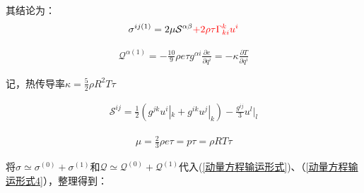 \documentclass[LBMDerivation.tex]{subfiles}
\begin{document}
其结论为：
\begin{equation}
  \begin{gathered}
    \sigma^{ij(1)}= 2 \mu \mathcal{S}^{\alpha\beta}   {\color{red} + 2\rho \tau \Gamma_{ki}^k u^i}
  \end{gathered}
\end{equation}




\begin{equation}
  \begin{gathered}
    \mathcal{Q}^{\alpha (1)}
    = -\frac{10}{9}\rho e \tau g^{\alpha i}\frac{\partial e}{\partial q^i} = -\kappa \frac{\partial T}{\partial q^i} 
  \end{gathered}
\end{equation}

记，热传导率$\kappa=\frac{5}{2}\rho R^2 T \tau$




\begin{equation}
  \begin{gathered}
    \mathcal{S}^{ij}=\frac{1}{2} (g^{jk} u^i|_k+g^{ik} u^j|_k) -\frac{g^{ij}}{3}u^l|_l
  \end{gathered}
\end{equation}

\begin{equation}
  \begin{aligned}
    \mu=\frac{2}{3} \rho e \tau=p \tau=\rho R T \tau
  \end{aligned}
\end{equation}




将$\sigma\simeq \sigma^{(0)}+\sigma^{(1)}$和$\mathcal{Q}\simeq \mathcal{Q}^{(0)}+\mathcal{Q}^{(1)}$代入(\ref{动量方程输运形式})、（\ref{动量方程输运形式4}），整理得到：



\end{document}

